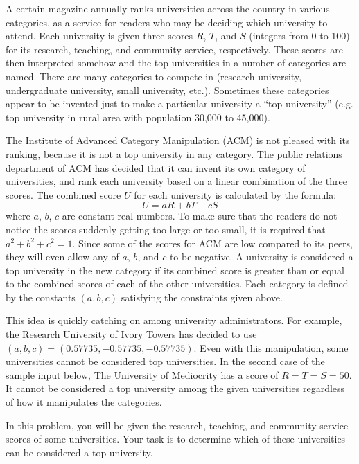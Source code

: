 
A certain magazine annually ranks universities across the country in
various categories, as a service for readers who may be deciding
which university to attend.  Each university is given three scores
$R$, $T$, and $S$ (integers from 0 to 100) for its research, teaching,
and community service, respectively. These scores are then interpreted
somehow and the top universities in a number of categories are named.
There are many categories to compete in (research university,
undergraduate university, small university, etc.).  Sometimes these
categories appear to be invented just to make a particular university
a ``top university'' (e.g. top university in rural area with
population 30,000 to 45,000).

The Institute of Advanced Category Manipulation (ACM) is not pleased
with its ranking, because it is not a top university in any
category.  The public relations department of ACM has decided that it
can invent its own category of universities, and rank each university
based on a linear combination of the three scores. The combined score
$U$ for each university is calculated by the formula:
\[ U = aR + bT + cS \] 
where $a$, $b$, $c$ are constant real numbers. To make sure that
the readers do not notice the scores suddenly getting too large or too
small, it is required that $a^2 + b^2 + c^2 = 1$. Since some of the
scores for ACM are low compared to its peers, they will even allow any
of $a$, $b$, and $c$ to be negative. A university is considered a top
university in the new category if its combined score is greater than
or equal to the combined scores of each of the other universities.
Each category is defined by the constants $(a,b,c)$ satisfying the
constraints given above.

This idea is quickly catching on among university administrators. For
example, the Research University of Ivory Towers has decided to use
$(a,b,c) = (0.57735, -0.57735, -0.57735)$.  Even with this
manipulation, some universities cannot be considered top universities.
In the second case of the sample input below, The University of
Mediocrity has a score of $R = T = S = 50$.  It cannot be considered a top
university among the given universities regardless of how it
manipulates the categories.

In this problem, you will be given the research, teaching, and
community service scores of some universities.  Your task is to
determine which of these universities can be considered a top
university.

